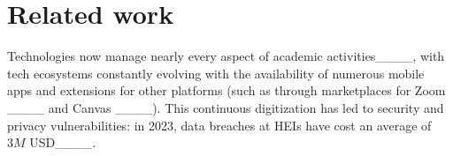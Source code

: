 \section{Related work}
Technologies now manage nearly every aspect of academic activities____, with tech ecosystems constantly evolving with the availability of numerous mobile apps and extensions for other platforms (such as through marketplaces for Zoom ____ and Canvas ____). %
This continuous digitization has led to security and privacy vulnerabilities: in 2023, data breaches at HEIs have cost an average of $3M$ USD____. 


